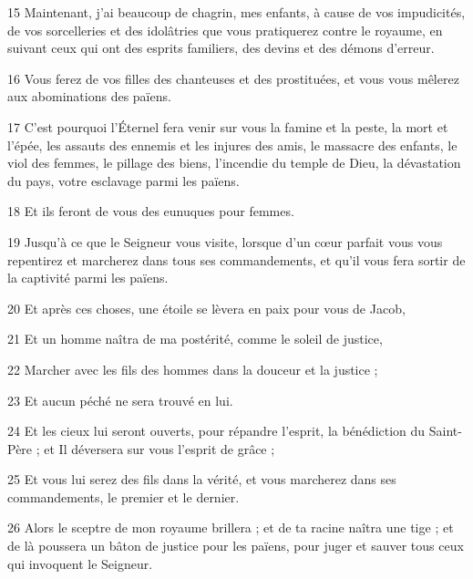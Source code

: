 \par 15 Maintenant, j'ai beaucoup de chagrin, mes enfants, à cause de vos impudicités, de vos sorcelleries et des idolâtries que vous pratiquerez contre le royaume, en suivant ceux qui ont des esprits familiers, des devins et des démons d'erreur.

\par 16 Vous ferez de vos filles des chanteuses et des prostituées, et vous vous mêlerez aux abominations des païens.

\par 17 C'est pourquoi l'Éternel fera venir sur vous la famine et la peste, la mort et l'épée, les assauts des ennemis et les injures des amis, le massacre des enfants, le viol des femmes, le pillage des biens, l'incendie du temple de Dieu, la dévastation du pays, votre esclavage parmi les païens.

\par 18 Et ils feront de vous des eunuques pour femmes.

\par 19 Jusqu'à ce que le Seigneur vous visite, lorsque d'un cœur parfait vous vous repentirez et marcherez dans tous ses commandements, et qu'il vous fera sortir de la captivité parmi les païens.

\par 20 Et après ces choses, une étoile se lèvera en paix pour vous de Jacob,

\par 21 Et un homme naîtra de ma postérité, comme le soleil de justice,

\par 22 Marcher avec les fils des hommes dans la douceur et la justice ;

\par 23 Et aucun péché ne sera trouvé en lui.

\par 24 Et les cieux lui seront ouverts, pour répandre l'esprit, la bénédiction du Saint-Père ; et Il déversera sur vous l'esprit de grâce ;

\par 25 Et vous lui serez des fils dans la vérité, et vous marcherez dans ses commandements, le premier et le dernier.

\par 26 Alors le sceptre de mon royaume brillera ; et de ta racine naîtra une tige ; et de là poussera un bâton de justice pour les païens, pour juger et sauver tous ceux qui invoquent le Seigneur.

